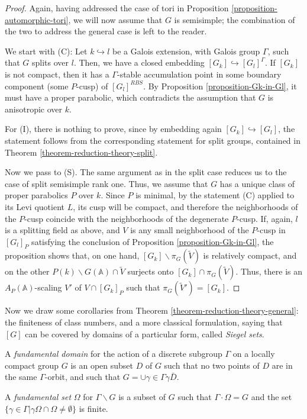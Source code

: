 \begin{proof}
Again, having addressed the case of tori in Proposition \ref{proposition-automorphic-tori}, we will now assume that $G$ is semisimple; the combination of the two to address the general case is left to the reader. 


We start with (C):  Let $k\hookrightarrow l$ be a Galois extension, with Galois group $\Gamma$, such that $G$ splits over $l$. Then, we have a closed embedding $[G_k]\hookrightarrow [G_l]^\Gamma$. If $[G_k]$ is not compact, then it has a $\Gamma$-stable accumulation point in some boundary component (some $P$-cusp) of $[G_l]^{RBS}$. By Proposition \ref{proposition-Gk-in-Gl}, it must have a proper parabolic, which contradicts the assumption that $G$ is anisotropic over $k$.

For (I), there is nothing to prove, since by embedding again $[G_k]\hookrightarrow [G_l]$, the statement follows from the corresponding statement for split groups, contained in Theorem \ref{theorem-reduction-theory-split}.

 
Now we pass to (S). The same argument as in the split case reduces us to the case of split semisimple rank one. Thus, we assume that $G$ has a unique class of proper parabolics $P$ over $k$.  Since $P$ is minimal, by the statement (C) applied to its Levi quotient $L$, its cusp will be compact, and therefore the neighborhoods of the $P$-cusp coincide with the neighborhoods of the degenerate $P$-cusp. If, again, $l$ is a splitting field as above, and $V$ is any small neighborhood of the $P$-cusp in $[G_l]_P$ satisfying the conclusion of Proposition \ref{proposition-Gk-in-Gl}, the proposition shows that, on one hand, $[G_k]\smallsetminus \pi_G(\tilde V)$ is relatively compact, and on the other $P(k)\backslash G(\mathbb A)\cap \tilde V$ surjects onto $[G_k]\cap  \pi_G(\tilde V)$. Thus, there is an $A_P(\mathbb A)$-scaling $V'$ of $V\cap [G_k]_P$ such that $\pi_G(\tilde V') = [G_k]$. 
\end{proof}

Now we draw some corollaries from Theorem \ref{theorem-reduction-theory-general}: the finiteness of class numbers, and a more classical formulation, saying that $[G]$ can be covered by domains of a particular form, called \emph{Siegel sets}.

\begin{definition}
 \label{definition-fundamental-set-domain}
A {\it fundamental domain} for the action of a discrete subgroup $\Gamma$ on a locally compact group $G$ is an open subset $D$ of $G$ such that no two points of $D$ are in the same $\Gamma$-orbit, and such that $G= \cup{\gamma\in \Gamma} \gamma \bar D$. 

A {\it fundamental set} $\Omega$ for $\Gamma\backslash G$ is a subset of $G$ such that $\Gamma\cdot \Omega= G$ and the set $\{\gamma\in \Gamma | \gamma \Omega \cap \Omega \neq \emptyset\}$ is finite. 
\end{definition}


